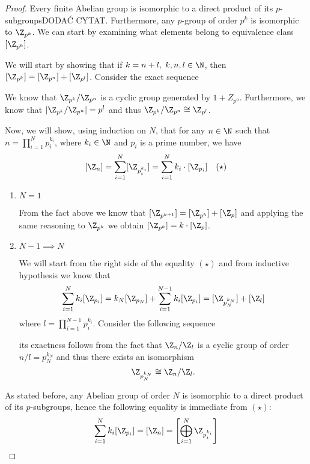 \begin{proof}
Every finite Abelian group is isomorphic to a direct product of its $p$-subgroups{\large\color{red}DODAĆ CYTAT}. Furthermore, any $p$-group of order $p^k$ is isomorphic to $\Z_{p^k}$. We can start by examining what elements belong to equivalence class $[\Z_{p^k}]$.

We will start by showing that if $k=n+l,\; k,n,l\in\N$, then $[\Z_{p^k}]=[\Z_{p^n}]+[\Z_{p^l}]$. Consider the exact sequence

\begin{center}\end{center}

We know that $\Z_{p^k}/\Z_{p^n}$ is a cyclic group generated by $1+Z_{p^n}$. Furthermore, we know that $|\Z_{p^k}/\Z_{p^n}|=p^l$ and thus $\Z_{p^k}/\Z_{p^n}\cong \Z_{p^l}$.



Now, we will show, using induction on $N$, that for any $n\in\N$ such that $n=\prod_{i=1}^N p_i^{k_i}$, where $k_i\in\N$ and $p_i$ is a prime number, we have
$$ [\Z_n] = \sum_{i=1}^N[\Z_{p_i^{k_i}}] = \sum_{i=1}^N k_i\cdot[\Z_{p_i}]\quad (\star) $$

\begin{enumerate}
  \item $N=1$

    From the fact above we know that $[\Z_{p^{k+1}}]=[\Z_{p^k}]+[\Z_p]$ and applying the same reasoning to $\Z_{p^k}$ we obtain $[\Z_{p^k}]=k\cdot[\Z_p]$.
  \item $N-1\implies N$

    We will start from the right side of the equality $(\star)$ and from inductive hypothesis we know that
    $$\sum_{i=1}^{N}k_i[\Z_{p_i}]=k_{N}[\Z_{p_{N}}]+\sum_{i=1}^{N-1}k_i[\Z_{p_i}]=[\Z_{p_{N}^{k_{N}}}]+[\Z_l]$$
    where $l=\prod_{i=1}^{N-1}p_i^{k_i}$. Consider the following sequence
    \begin{center}\end{center}
    its exactness follows from the fact that $\Z_n/\Z_l$ is a cyclic group of order $n/l=p_N^{k_N}$ and thus there exists an isomorphism
    $$\Z_{p_N^{k_N}}\cong \Z_n/\Z_l.$$
\end{enumerate}

As stated before, any Abelian group of order $N$ is isomorphic to a direct product of its $p$-subgroups, hence the following equality is immediate from $(\star)$:
$$\sum_{i=1}^N k_i[\Z_{p_i}] = [\Z_n]=\left[ \bigoplus_{i=1}^N \Z_{p_i^{k_i}} \right]$$
\end{proof}

